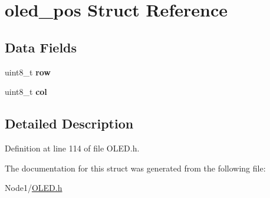\hypertarget{structoled__pos}{}\section{oled\+\_\+pos Struct Reference}
\label{structoled__pos}
\subsection*{Data Fields}
\begin{DoxyCompactItemize}
\item 
\mbox{\label{structoled__pos_af7cfc64ac1710a3e8f1c61eb4aa66cdf}} 
uint8\+\_\+t {\bfseries row}
\item 
\mbox{\label{structoled__pos_a9970f83c83a9307713651e361bf5ca1e}} 
uint8\+\_\+t {\bfseries col}
\end{DoxyCompactItemize}


\subsection{Detailed Description}


Definition at line 114 of file O\+L\+E\+D.\+h.



The documentation for this struct was generated from the following file\+:\begin{DoxyCompactItemize}
\item 
Node1/\hyperlink{OLED_8h}{O\+L\+E\+D.\+h}\end{DoxyCompactItemize}

